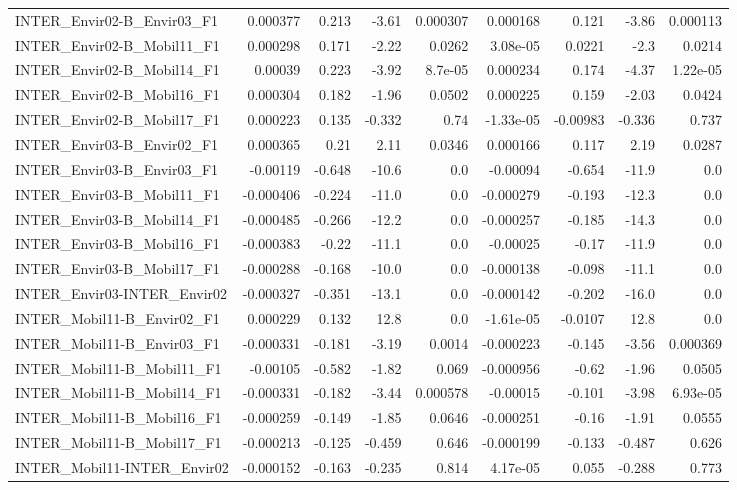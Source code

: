\begin{tabular}{lrrrrrrrr}
INTER_Envir02-B_Envir03_F1 & 0.000377 & 0.213 & -3.61 & 0.000307 & 0.000168 & 0.121 & -3.86 & 0.000113 \\
INTER_Envir02-B_Mobil11_F1 & 0.000298 & 0.171 & -2.22 & 0.0262 & 3.08e-05 & 0.0221 & -2.3 & 0.0214 \\
INTER_Envir02-B_Mobil14_F1 & 0.00039 & 0.223 & -3.92 & 8.7e-05 & 0.000234 & 0.174 & -4.37 & 1.22e-05 \\
INTER_Envir02-B_Mobil16_F1 & 0.000304 & 0.182 & -1.96 & 0.0502 & 0.000225 & 0.159 & -2.03 & 0.0424 \\
INTER_Envir02-B_Mobil17_F1 & 0.000223 & 0.135 & -0.332 & 0.74 & -1.33e-05 & -0.00983 & -0.336 & 0.737 \\
INTER_Envir03-B_Envir02_F1 & 0.000365 & 0.21 & 2.11 & 0.0346 & 0.000166 & 0.117 & 2.19 & 0.0287 \\
INTER_Envir03-B_Envir03_F1 & -0.00119 & -0.648 & -10.6 & 0.0 & -0.00094 & -0.654 & -11.9 & 0.0 \\
INTER_Envir03-B_Mobil11_F1 & -0.000406 & -0.224 & -11.0 & 0.0 & -0.000279 & -0.193 & -12.3 & 0.0 \\
INTER_Envir03-B_Mobil14_F1 & -0.000485 & -0.266 & -12.2 & 0.0 & -0.000257 & -0.185 & -14.3 & 0.0 \\
INTER_Envir03-B_Mobil16_F1 & -0.000383 & -0.22 & -11.1 & 0.0 & -0.00025 & -0.17 & -11.9 & 0.0 \\
INTER_Envir03-B_Mobil17_F1 & -0.000288 & -0.168 & -10.0 & 0.0 & -0.000138 & -0.098 & -11.1 & 0.0 \\
INTER_Envir03-INTER_Envir02 & -0.000327 & -0.351 & -13.1 & 0.0 & -0.000142 & -0.202 & -16.0 & 0.0 \\
INTER_Mobil11-B_Envir02_F1 & 0.000229 & 0.132 & 12.8 & 0.0 & -1.61e-05 & -0.0107 & 12.8 & 0.0 \\
INTER_Mobil11-B_Envir03_F1 & -0.000331 & -0.181 & -3.19 & 0.0014 & -0.000223 & -0.145 & -3.56 & 0.000369 \\
INTER_Mobil11-B_Mobil11_F1 & -0.00105 & -0.582 & -1.82 & 0.069 & -0.000956 & -0.62 & -1.96 & 0.0505 \\
INTER_Mobil11-B_Mobil14_F1 & -0.000331 & -0.182 & -3.44 & 0.000578 & -0.00015 & -0.101 & -3.98 & 6.93e-05 \\
INTER_Mobil11-B_Mobil16_F1 & -0.000259 & -0.149 & -1.85 & 0.0646 & -0.000251 & -0.16 & -1.91 & 0.0555 \\
INTER_Mobil11-B_Mobil17_F1 & -0.000213 & -0.125 & -0.459 & 0.646 & -0.000199 & -0.133 & -0.487 & 0.626 \\
INTER_Mobil11-INTER_Envir02 & -0.000152 & -0.163 & -0.235 & 0.814 & 4.17e-05 & 0.055 & -0.288 & 0.773 \\

\end{tabular}
